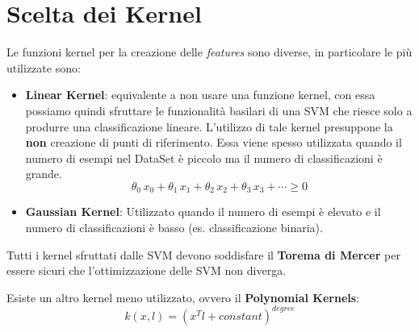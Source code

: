 \section{Scelta dei Kernel}
Le funzioni kernel per la creazione delle \textit{features} sono diverse, in particolare le più utilizzate sono:
\begin{itemize}
    \item \textbf{Linear Kernel}: equivalente a non usare una funzione kernel, con essa possiamo quindi sfruttare le funzionalità basilari di una SVM che riesce solo a produrre una classificazione lineare. L'utilizzo di tale kernel presuppone la \textbf{non} creazione di punti di riferimento. Essa viene spesso utilizzata quando il numero di esempi nel DataSet è piccolo ma il numero di classificazioni è grande.
    \[\theta_0\,x_0 + \theta_1\,x_1 + \theta_2\,x_2 + \theta_3\,x_3 + \cdots \geq 0\]
    \item \textbf{Gaussian Kernel}: Utilizzato quando il numero di esempi è elevato e il numero di classificazioni è basso (es. classificazione binaria).
\end{itemize}
\begin{definizione}
  Tutti i kernel sfruttati dalle SVM devono soddisfare il \textbf{Torema di Mercer} per essere sicuri che l'ottimizzazione delle SVM non diverga.
\end{definizione}
\begin{nota}

Esiste un altro kernel meno utilizzato, ovvero il \textbf{Polynomial Kernels}:
\[k(x, l) = (x^T l + constant)^{degree}\]
\end{nota}
